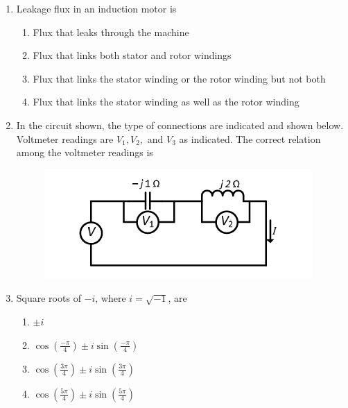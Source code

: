 \documentclass[journal,12pt,onecolumn]{IEEEtran}
\theoremstyle{remark}
\begin{document}
\begin{enumerate}
\item Leakage flux in an induction motor is  
\begin{enumerate}
\item Flux that leaks through the machine  
\item Flux that links both stator and rotor windings  
\item Flux that links the stator winding or the rotor winding but not both  
\item Flux that links the stator winding as well as the rotor winding  
\end{enumerate}

\item In the circuit shown, the type of connections are indicated and shown below.  
Voltmeter readings are $V_1, V_2,$ and $V_3$ as indicated. The correct relation among the voltmeter readings is  


\begin{figure}[h]
    \centering
    \includegraphics[width=0.5\columnwidth]{figs/8.png}
    \label{fig:placeholder}
\end{figure}
\begin{enumerate}
\end{enumerate}

\item Square roots of $-i$, where $i=\sqrt{-1}$, are  
\begin{enumerate}
\item $\pm i$  
\item $\cos\left(\tfrac{-\pi}{4}\right) \pm i\sin\left(\tfrac{-\pi}{4}\right)$  
\item $\cos\left(\tfrac{3\pi}{4}\right) \pm i\sin\left(\tfrac{3\pi}{4}\right)$  
\item $\cos\left(\tfrac{5\pi}{4}\right) \pm i\sin\left(\tfrac{5\pi}{4}\right)$  
\end{enumerate}


\end{enumerate}
\end{document}

